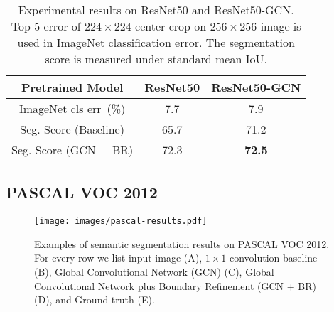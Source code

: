 \documentclass[10pt,twocolumn,letterpaper]{article}
\begin{document}
   \begin{table}[h]
      \begin{center}
         \begin{tabular}{|c|c|c|}
            \hline
            Pretrained Model & ResNet50 & ResNet50-GCN \\
            \hline
            ImageNet cls err~(\%) & 7.7 & 7.9 \\
            \hline
            Seg. Score (Baseline) &  65.7 &  71.2 \\
            \hline
            Seg. Score (GCN + BR) & 72.3 & \textbf{72.5}\\
            \hline
         \end{tabular}
      \end{center}
      \caption{Experimental results on ResNet50 and ResNet50-GCN. Top-5 error of $224\times 224$ center-crop on $256\times 256$ image is used in ImageNet classification error. The segmentation score is measured under standard mean IoU.}
      \label{table:exp-on-res50sp}
   \end{table}
\subsection{PASCAL VOC 2012}
   \begin{figure*}[htbp]
      \begin{center}
         \texttt{[image: images/pascal-results.pdf]}
      \end{center}
      \caption{Examples of semantic segmentation results on PASCAL VOC 2012. For every row we list input image (A), $1\times 1$ convolution baseline (B), Global Convolutional Network (GCN) (C), Global Convolutional Network plus Boundary Refinement (GCN + BR) (D), and Ground truth (E). }
      \label{fig:pascal-results}
   \end{figure*}
\end{document}
